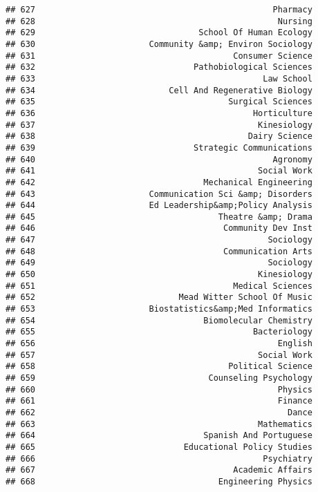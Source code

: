 \documentclass[
]{article}
\begin{document}
\begin{verbatim}
## 627                                                Pharmacy
## 628                                                 Nursing
## 629                                 School Of Human Ecology
## 630                       Community &amp; Environ Sociology
## 631                                        Consumer Science
## 632                                Pathobiological Sciences
## 633                                              Law School
## 634                           Cell And Regenerative Biology
## 635                                       Surgical Sciences
## 636                                            Horticulture
## 637                                             Kinesiology
## 638                                           Dairy Science
## 639                                Strategic Communications
## 640                                                Agronomy
## 641                                             Social Work
## 642                                  Mechanical Engineering
## 643                       Communication Sci &amp; Disorders
## 644                       Ed Leadership&amp;Policy Analysis
## 645                                     Theatre &amp; Drama
## 646                                      Community Dev Inst
## 647                                               Sociology
## 648                                      Communication Arts
## 649                                               Sociology
## 650                                             Kinesiology
## 651                                        Medical Sciences
## 652                             Mead Witter School Of Music
## 653                       Biostatistics&amp;Med Informatics
## 654                                  Biomolecular Chemistry
## 655                                            Bacteriology
## 656                                                 English
## 657                                             Social Work
## 658                                       Political Science
## 659                                   Counseling Psychology
## 660                                                 Physics
## 661                                                 Finance
## 662                                                   Dance
## 663                                             Mathematics
## 664                                  Spanish And Portuguese
## 665                              Educational Policy Studies
## 666                                              Psychiatry
## 667                                        Academic Affairs
## 668                                     Engineering Physics

\end{verbatim}
\end{document}
